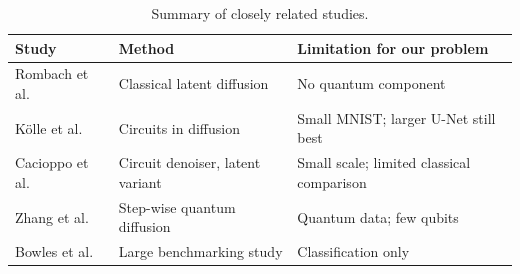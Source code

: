 \begin{table}[t]
\caption{Summary of closely related studies.}\label{tab:related}
\centering\scriptsize
\renewcommand{\arraystretch}{1.2}
\begin{tabular}{@{}>{\raggedright\arraybackslash}p{}>{\raggedright\arraybackslash}p{}>{\raggedright\arraybackslash}p{}@{}}
\toprule
Study & Method & Limitation for our problem\\
\midrule
Rombach et al.~\cite{rombach} & Classical latent diffusion & No quantum component\\
K\"olle et al.~\cite{kolle} & Circuits in diffusion & Small MNIST; larger U-Net still best\\
Cacioppo et al.~\cite{cacioppo} & Circuit denoiser, latent variant & Small scale; limited classical comparison\\
Zhang et al.~\cite{zhang} & Step-wise quantum diffusion & Quantum data; few qubits\\
Bowles et al.~\cite{bowles} & Large benchmarking study & Classification only\\
\bottomrule
\end{tabular}
\end{table}
